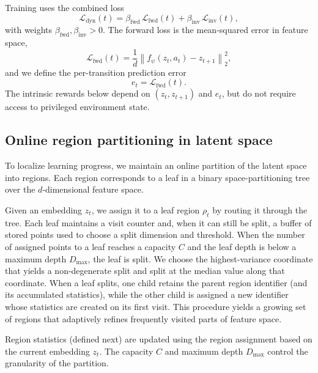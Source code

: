 Training uses the combined loss
\begin{equation}
    \mathcal{L}_{\mathrm{dyn}}(t) = \beta_{\mathrm{fwd}}\,\mathcal{L}_{\mathrm{fwd}}(t) + \beta_{\mathrm{inv}}\,\mathcal{L}_{\mathrm{inv}}(t),
\end{equation}
with weights $\beta_{\mathrm{fwd}},\beta_{\mathrm{inv}}>0$.
The forward loss is the mean-squared error in feature space,
\begin{equation}
    \mathcal{L}_{\mathrm{fwd}}(t) = \frac{1}{d}\left\lVert f_\psi(z_t,a_t) - z_{t+1} \right\rVert_2^2,
\end{equation}
and we define the per-transition prediction error
\begin{equation}
    e_t = \mathcal{L}_{\mathrm{fwd}}(t).
\end{equation}
The intrinsic rewards below depend on $(z_t,z_{t+1})$ and $e_t$, but do not require access to privileged environment state.

\subsection{Online region partitioning in latent space}

To localize learning progress, we maintain an online partition of the latent space into regions.
Each region corresponds to a leaf in a binary space-partitioning tree over the $d$-dimensional feature space.

Given an embedding $z_t$, we assign it to a leaf region $\rho_t$ by routing it through the tree.
Each leaf maintains a visit counter and, when it can still be split, a buffer of stored points used to choose a split dimension and threshold.
When the number of assigned points to a leaf reaches a capacity $C$ and the leaf depth is below a maximum depth $D_{\max}$, the leaf is split.
We choose the highest-variance coordinate that yields a non-degenerate split and split at the median value along that coordinate.
When a leaf splits, one child retains the parent region identifier (and its accumulated statistics), while the other child is assigned a new identifier whose statistics are created on its first visit.
This procedure yields a growing set of regions that adaptively refines frequently visited parts of feature space.

Region statistics (defined next) are updated using the region assignment based on the current embedding $z_t$.
The capacity $C$ and maximum depth $D_{\max}$ control the granularity of the partition.

